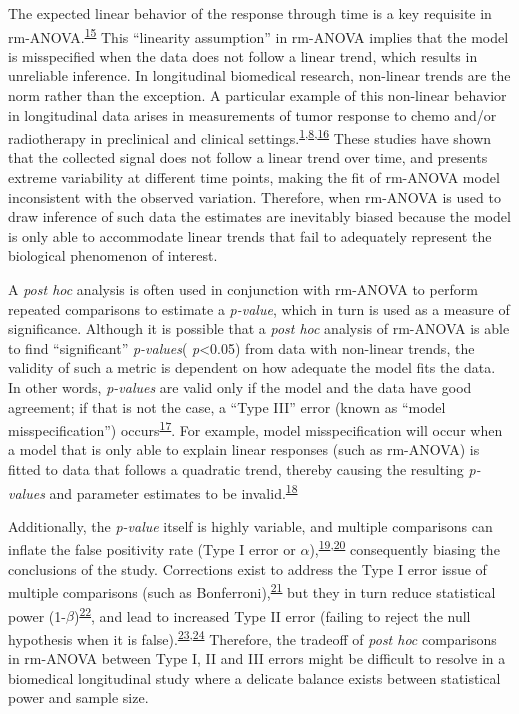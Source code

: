 \documentclass[
]{article}
\begin{document}
The expected linear behavior of the response through time is a key requisite in rm-ANOVA.\textsuperscript{\protect\hyperlink{ref-pinheiro2006}{15}} This ``linearity assumption'' in rm-ANOVA implies that the model is misspecified when the data does not follow a linear trend, which results in unreliable inference. In longitudinal biomedical research, non-linear trends are the norm rather than the exception. A particular example of this non-linear behavior in longitudinal data arises in measurements of tumor response to chemo and/or radiotherapy in preclinical and clinical settings.\textsuperscript{\protect\hyperlink{ref-roblyer2011}{1},\protect\hyperlink{ref-skala2010}{8},\protect\hyperlink{ref-vishwanath2009}{16}} These studies have shown that the collected signal does not follow a linear trend over time, and presents extreme variability at different time points, making the fit of rm-ANOVA model inconsistent with the observed variation. Therefore, when rm-ANOVA is used to draw inference of such data the estimates are inevitably biased because the model is only able to accommodate linear trends that fail to adequately represent the biological phenomenon of interest.

A \emph{post hoc} analysis is often used in conjunction with rm-ANOVA to perform repeated comparisons to estimate a \emph{p-value}, which in turn is used as a measure of significance.
Although it is possible that a \emph{post hoc} analysis of rm-ANOVA is able to find ``significant'' \emph{p-values}( \emph{p}\textless0.05) from data with non-linear trends, the validity of such a metric is dependent on how adequate the model fits the data. In other words, \emph{p-values} are valid only if the model and the data have good agreement; if that is not the case, a ``Type III'' error (known as ``model misspecification'') occurs\textsuperscript{\protect\hyperlink{ref-dennis2019}{17}}. For example, model misspecification will occur when a model that is only able to explain linear responses (such as rm-ANOVA) is fitted to data that follows a quadratic trend, thereby causing the resulting \emph{p-values} and parameter estimates to be invalid.\textsuperscript{\protect\hyperlink{ref-wang2019}{18}}

Additionally, the \emph{p-value} itself is highly variable, and multiple comparisons can inflate the false positivity rate (Type I error or \(\alpha\)),\textsuperscript{\protect\hyperlink{ref-liu2010}{19},\protect\hyperlink{ref-halsey2015}{20}} consequently biasing the conclusions of the study. Corrections exist to address the Type I error issue of multiple comparisons (such as Bonferroni),\textsuperscript{\protect\hyperlink{ref-abdi2010}{21}} but they in turn reduce statistical power (1-\(\beta\))\textsuperscript{\protect\hyperlink{ref-nakagawa2004}{22}}, and lead to increased Type II error (failing to reject the null hypothesis when it is false).\textsuperscript{\protect\hyperlink{ref-gelman2012}{23},\protect\hyperlink{ref-albers2019}{24}} Therefore, the tradeoff of \emph{post hoc} comparisons in rm-ANOVA between Type I, II and III errors might be difficult to resolve in a biomedical longitudinal study where a delicate balance exists between statistical power and sample size.
\end{document}
